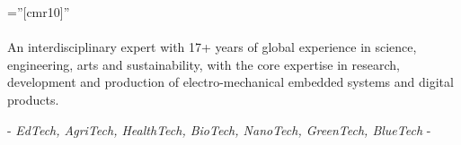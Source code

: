 \font\fb=''[cmr10]''

\par{
\paragraph{}
An interdisciplinary expert with 17+ years of global experience in science, engineering, arts and sustainability, with the core expertise in research, development and production of electro-mechanical embedded systems and digital products.

- \emph{EdTech, AgriTech, HealthTech, BioTech, NanoTech, GreenTech, BlueTech} -

\par}
